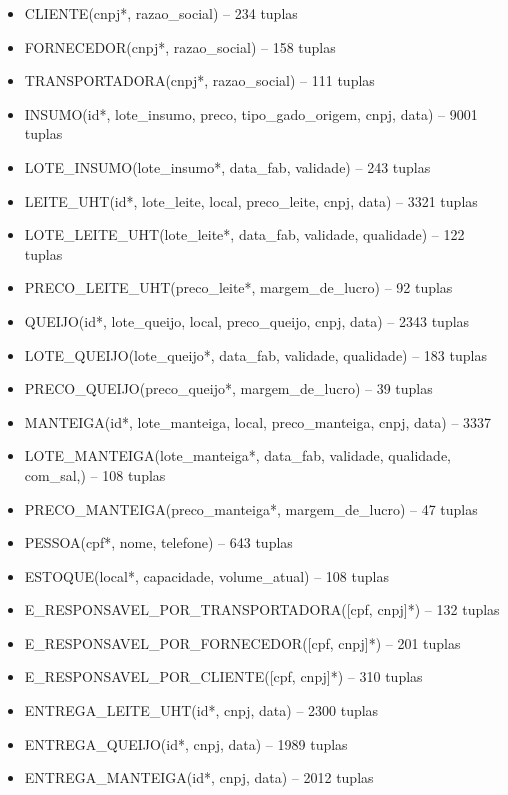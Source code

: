 \documentclass[11pt]{article}
\begin{document}
\begin{itemize}
	\item CLIENTE(cnpj*, razao\_social) -- 234 tuplas
	\item FORNECEDOR(cnpj*, razao\_social) -- 158 tuplas
	\item TRANSPORTADORA(cnpj*, razao\_social) -- 111 tuplas

	\item INSUMO(id*, lote\_insumo, preco, tipo\_gado\_origem, cnpj, data) 
		-- 9001 tuplas
	\item LOTE\_INSUMO(lote\_insumo*, data\_fab, validade) -- 243 tuplas

	\item LEITE\_UHT(id*, lote\_leite, local, preco\_leite, cnpj, data) 
		-- 3321 tuplas
	\item LOTE\_LEITE\_UHT(lote\_leite*, data\_fab, validade,  qualidade) 
		-- 122 tuplas
	\item PRECO\_LEITE\_UHT(preco\_leite*, margem\_de\_lucro) -- 92 tuplas

	\item QUEIJO(id*, lote\_queijo, local, preco\_queijo, cnpj, data) 
		-- 2343 tuplas
	\item LOTE\_QUEIJO(lote\_queijo*, data\_fab, validade,  qualidade) 
		-- 183 tuplas
	\item PRECO\_QUEIJO(preco\_queijo*, margem\_de\_lucro) 
		-- 39 tuplas

	\item MANTEIGA(id*, lote\_manteiga, local, preco\_manteiga, cnpj, data)
		-- 3337
	\item LOTE\_MANTEIGA(lote\_manteiga*, data\_fab, validade,  qualidade, com\_sal,) -- 108 tuplas
	\item PRECO\_MANTEIGA(preco\_manteiga*, margem\_de\_lucro)
		-- 47 tuplas

	\item PESSOA(cpf*, nome, telefone) -- 643 tuplas

	\item ESTOQUE(local*, capacidade, volume\_atual) -- 108 tuplas

	\item E\_RESPONSAVEL\_POR\_TRANSPORTADORA([cpf, cnpj]*) -- 132 tuplas
	\item E\_RESPONSAVEL\_POR\_FORNECEDOR([cpf, cnpj]*) -- 201 tuplas
	\item E\_RESPONSAVEL\_POR\_CLIENTE([cpf, cnpj]*) -- 310 tuplas

	\item ENTREGA\_LEITE\_UHT(id*, cnpj, data) -- 2300 tuplas
	\item ENTREGA\_QUEIJO(id*, cnpj, data) -- 1989 tuplas
	\item ENTREGA\_MANTEIGA(id*, cnpj, data) -- 2012 tuplas
\end{itemize}
\end{document}

